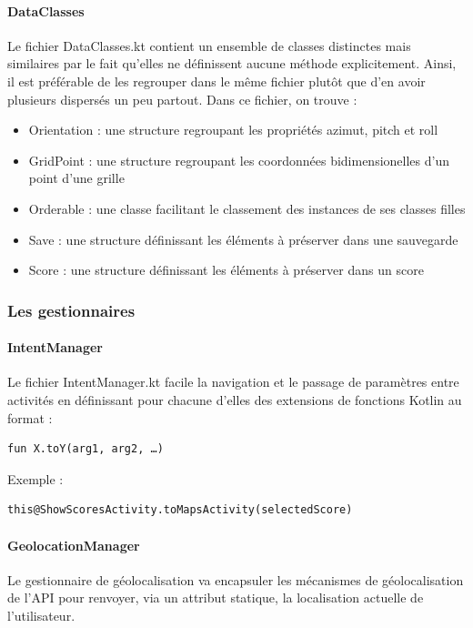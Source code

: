 \documentclass{article}
\begin{document}
\paragraph{DataClasses}
Le fichier DataClasses.kt contient un ensemble de classes distinctes mais similaires par le fait qu’elles ne définissent aucune méthode explicitement. Ainsi, il est préférable de les regrouper dans le même fichier plutôt que d’en avoir plusieurs dispersés un peu partout. Dans ce fichier, on trouve :
\begin{itemize}
\item Orientation : une structure regroupant les propriétés azimut, pitch et roll
\item GridPoint : une structure regroupant les coordonnées bidimensionelles d'un point d’une grille
\item Orderable : une classe facilitant le classement des instances de ses classes filles
\item Save : une structure définissant les éléments à préserver dans une sauvegarde
\item Score : une structure définissant les éléments à préserver dans un score
\end{itemize}

\subsubsection{Les gestionnaires}

\paragraph{IntentManager}
Le fichier IntentManager.kt facile la navigation et le passage de paramètres entre activités en définissant pour chacune d'elles des extensions de fonctions Kotlin au format :
\begin{verbatim}
fun X.toY(arg1, arg2, …)
\end{verbatim}
Exemple :
\begin{verbatim}
this@ShowScoresActivity.toMapsActivity(selectedScore)
\end{verbatim}

\paragraph{GeolocationManager}
Le gestionnaire de géolocalisation va encapsuler les mécanismes de géolocalisation de l'API pour renvoyer, via un attribut statique, la localisation actuelle de l'utilisateur.
\end{document}

